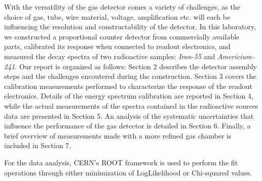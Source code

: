 With the versatility of the gas detector comes a variety of challenges, as the choice of gas, tube, wire material, voltage, amplification etc. will each be influencing the resolution and constructability of the detector. In this laboratory, we constructed a proportional counter detector from commercially available parts, calibrated its response when connected to readout electronics, and measured the decay spectra of two radioactive samples: \emph{Iron-55} and \emph{Americium-241}. Our report is organized as follows: Section 2 describes the detector assembly steps and the challenges encoutered during the construction. Section 3 covers the calibration measurements performed to characterize the response of the readout electronics. Details of the energy spectrum calibration are reported in Section 4, while the actual measurements of the spectra contained in the radioactive sources data are presented in Section 5. An analysis of the systematic uncertainties that influence the performance of the gas detector is detailed in Section 6. Finally, a brief overview of measurements made with a more refined gas chamber is included in Section 7.

For the data analysis, CERN's ROOT framework \cite{Brun:1997pa} is used to perform the fit operations through either minimization of LogLikelihood or Chi-squared values.
